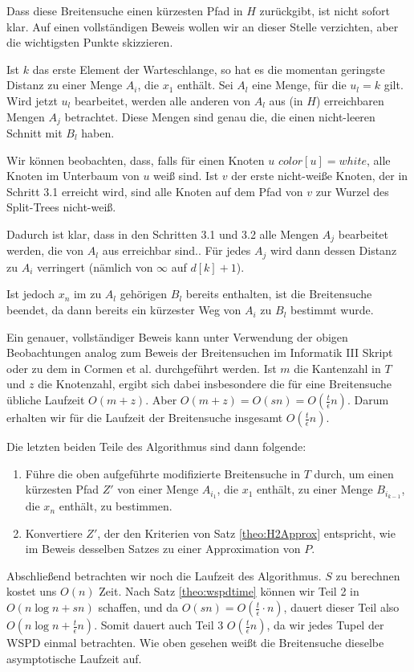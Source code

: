     Dass diese Breitensuche einen kürzesten Pfad in $H$ zurückgibt, ist nicht sofort klar. Auf einen vollständigen Beweis wollen wir an dieser Stelle verzichten, aber die wichtigsten Punkte skizzieren. 
    
    Ist $k$ das erste Element der Warteschlange, so hat es die momentan geringste Distanz zu einer Menge $A_i$, die $x_1$ enthält. Sei $A_l$ eine Menge, für die $u_l = k$ gilt. Wird jetzt $u_l$ bearbeitet, werden alle anderen von $A_l$ aus (in $H$) erreichbaren Mengen $A_j$ betrachtet. Diese Mengen sind genau die, die einen nicht-leeren Schnitt mit $B_l$ haben. 
    
	Wir können beobachten, dass, falls für einen Knoten $u$ $color[u] = white$, alle Knoten im Unterbaum von $u$ weiß sind. Ist $v$ der erste nicht-weiße Knoten, der in Schritt 3.1 erreicht wird, sind alle Knoten auf dem Pfad von $v$ zur Wurzel des Split-Trees nicht-weiß.
    
    Dadurch ist klar, dass in den Schritten 3.1 und 3.2 alle Mengen $A_j$ bearbeitet werden, die von $A_l$ aus erreichbar sind.. Für jedes $A_j$ wird dann dessen Distanz zu $A_i$ verringert (nämlich von $\infty$ auf $d[k]+1$). 
    
    Ist jedoch $x_n$ im zu $A_l$ gehörigen $B_l$ bereits enthalten, ist die Breitensuche beendet, da dann bereits ein kürzester Weg von $A_i$ zu $B_l$ bestimmt wurde.
    
    Ein genauer, vollständiger Beweis kann unter Verwendung der obigen Beobachtungen analog zum Beweis der Breitensuchen im Informatik III Skript \cite{hagerup} oder zu dem in Cormen et al. \cite{cormen} durchgeführt werden. Ist $m$ die Kantenzahl in $T$ und $z$ die Knotenzahl, ergibt sich dabei insbesondere die für eine Breitensuche übliche Laufzeit $O(m + z)$. Aber $O(m + z) = O(sn) = O(\frac{t}{\epsilon}n)$. Darum erhalten wir für die Laufzeit der Breitensuche insgesamt $O(\frac{t}{\epsilon}n)$.
    
    Die letzten beiden Teile des Algorithmus sind dann folgende:
    \begin{enumerate}[start=4, topsep=4mm]
    	\item Führe die oben aufgeführte modifizierte Breitensuche in $T$ durch, um einen kürzesten Pfad $Z'$ von einer Menge $A_{i_1}$, die $x_1$ enthält, zu einer Menge $B_{i_{k-1}}$, die $x_n$ enthält, zu bestimmen.
    	\item Konvertiere $Z'$, der den Kriterien von Satz \ref{theo:H2Approx} entspricht, wie im Beweis desselben Satzes zu einer Approximation von $P$.
    \end{enumerate}
    Abschließend betrachten wir noch die Laufzeit des Algorithmus. $S$ zu berechnen kostet uns $O(n)$ Zeit. Nach Satz \ref{theo:wspdtime} können wir Teil 2 in $O(n \log n + sn)$ schaffen, und da $O(sn) = O(\frac{t}{\epsilon}\cdot n)$, dauert dieser Teil also $O(n \log n + \frac{t}{\epsilon}n)$. Somit dauert auch Teil 3 $O(\frac{t}{\epsilon}n)$, da wir jedes Tupel der WSPD einmal betrachten. Wie oben gesehen weißt die Breitensuche dieselbe asymptotische Laufzeit auf. 
    
